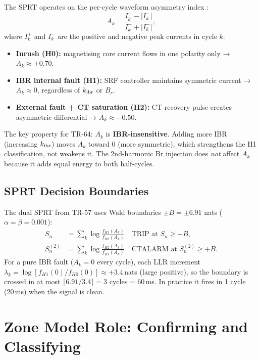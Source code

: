 \documentclass[11pt, a4paper]{article}
\newcommand{\kibr}{k_{\rm ibr}}
\newcommand{\Ak}{A_k}
\begin{document}
The SPRT operates on the per-cycle waveform asymmetry index \cite{SAMBP_TR57}:
\begin{equation}
  \Ak = \frac{I_k^+ - |I_k^-|}{I_k^+ + |I_k^-|},
\end{equation}
where $I_k^+$ and $I_k^-$ are the positive and negative peak currents in
cycle $k$.

\begin{itemize}
  \item \textbf{Inrush (H0):} magnetising core current flows in one polarity
    only → $\Ak \approx +0.70$.
  \item \textbf{IBR internal fault (H1):} SRF controller maintains symmetric
    current → $\Ak \approx 0$, regardless of $\kibr$ or $B_r$.
  \item \textbf{External fault + CT saturation (H2):} CT recovery pulse
    creates asymmetric differential → $\Ak \approx -0.50$.
\end{itemize}

The key property for TR-64: $\Ak$ is \textbf{IBR-insensitive}.  Adding more
IBR (increasing $\kibr$) moves $\Ak$ toward 0 (more symmetric), which
strengthens the H1 classification, not weakens it.  The 2nd-harmonic Br
injection does \emph{not} affect $\Ak$ because it adds equal energy to both
half-cycles.

\subsection{SPRT Decision Boundaries}

The dual SPRT from TR-57 uses Wald boundaries $\pm B = \pm 6.91$ nats
($\alpha = \beta = 0.001$):
\begin{align}
  S_n &= \textstyle\sum_k \log\frac{f_{H1}(\Ak)}{f_{H0}(\Ak)}
         \quad \text{TRIP at } S_n \geq +B, \\
  S_n^{(2)} &= \textstyle\sum_k \log\frac{f_{H2}(\Ak)}{f_{H1}(\Ak)}
         \quad \text{CTALARM at } S_n^{(2)} \geq +B.
\end{align}
For a pure IBR fault ($\Ak = 0$ every cycle), each LLR increment $\lambda_k
= \log[f_{H1}(0)/f_{H0}(0)] \approx +3.4$\,nats (large positive), so the
boundary is crossed in at most $\lceil 6.91/3.4 \rceil = 3$ cycles = 60\,ms.
In practice it fires in 1 cycle (20\,ms) when the signal is clean.


\section{Zone Model Role: Confirming and Classifying}
\label{sec:zone_model}
\end{document}

